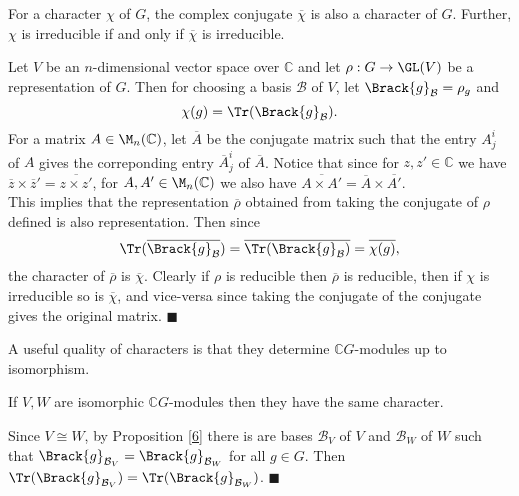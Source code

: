 \documentclass[../Project.tex]{subfiles}
\begin{document}
\begin{prop}[{\cite[Proposition 13.15]{2}}]
	\label{compconjcharischar}
	For a character $\chi$ of $G$, the complex conjugate $\overline{\chi}$ is also a character of $G$. Further, $\chi$ is irreducible if and only if $\overline{\chi}$ is irreducible.
\end{prop}

\begin{proo*}[{\cite[Proposition 13.15]{2}}]
	Let $V$ be an $n$-dimensional vector space over $\mathbb{C}$ and let $\rho : G \to \GL(V)$ be a representation of $G$. Then for choosing a basis $\mathcal{B}$ of $V$, let $\Brack{g}_\mathcal{B} = \rho_g$ and
	$$\chi(g) = \Tr(\Brack{g}_\mathcal{B}).$$
	For a matrix $A \in \M_n(\mathbb{C})$, let $\overline{A}$ be the conjugate matrix such that the entry $A^i_j$ of $A$ gives the correponding entry $\overline{A}^i_j$ of $\overline{A}$. Notice that since for $z,z' \in \mathbb{C}$ we have $\overline{z} \times \overline{z}' = \overline{z \times z'}$, for $A,A' \in \M_n(\mathbb{C})$ we also have $\overline{A\times A'} = \overline{A}\times\overline{A'}$.\\

	This implies that the representation $\overline{\rho}$ obtained from taking the conjugate of $\rho$ defined is also representation. Then since 
	$$\Tr({\overline{\Brack{g}_\mathcal{B}}}) = \overline{\Tr(\Brack{g}_\mathcal{B})} = \overline{\chi(g)},$$
	the character of $\overline{\rho}$ is $\overline{\chi}$. Clearly if $\rho$ is reducible then $\overline{\rho}$ is reducible, then if $\chi$ is irreducible so is $\overline{\chi}$, and vice-versa since taking the conjugate of the conjugate gives the original matrix. \hfill$\blacksquare$\\
\end{proo*}






A useful quality of characters is that they determine $\mathbb{C}G$-modules up to isomorphism.

\begin{prop}[{\cite[Proposition 13.5 (1)]{2}}]
\label{isomorphicmodhavesamechar}
	If $V,W$ are isomorphic $\mathbb{C}G$-modules then they have the same character.
\end{prop}
\begin{proo*}[{\cite[Proposition 13.5 (1)]{2}}]
	Since $V\cong W$, by Proposition \ref{6} there is are bases $\mathcal{B}_V$ of $V$ and $\mathcal{B}_W$ of $W$ such that $\Brack{g}_{\mathcal{B}_V} = \Brack{g}_{\mathcal{B}_W}$ for all $g \in G$. Then $\Tr(\Brack{g}_{\mathcal{B}_V}) = \Tr(\Brack{g}_{\mathcal{B}_W})$. \hfill$\blacksquare$\\
\end{proo*}
\end{document}
